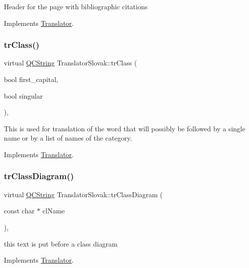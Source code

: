 Header for the page with bibliographic citations 

Implements \mbox{\hyperlink{class_translator}{Translator}}.

\mbox{\label{class_translator_slovak_ad59259153dc049698dc31ac29e8b12d5}} 
\subsubsection{\texorpdfstring{trClass()}{trClass()}}
{\footnotesize\ttfamily virtual \mbox{\hyperlink{class_q_c_string}{Q\+C\+String}} Translator\+Slovak\+::tr\+Class (\begin{DoxyParamCaption}\item[{bool}]{first\+\_\+capital,  }\item[{bool}]{singular }\end{DoxyParamCaption})\hspace{0.3cm}{\ttfamily [inline]}, {\ttfamily [virtual]}}

This is used for translation of the word that will possibly be followed by a single name or by a list of names of the category. 

Implements \mbox{\hyperlink{class_translator}{Translator}}.

\mbox{\label{class_translator_slovak_a9f00c85f79afc3bce60638211404a7fd}} 
\subsubsection{\texorpdfstring{trClassDiagram()}{trClassDiagram()}}
{\footnotesize\ttfamily virtual \mbox{\hyperlink{class_q_c_string}{Q\+C\+String}} Translator\+Slovak\+::tr\+Class\+Diagram (\begin{DoxyParamCaption}\item[{const char $\ast$}]{cl\+Name }\end{DoxyParamCaption})\hspace{0.3cm}{\ttfamily [inline]}, {\ttfamily [virtual]}}

this text is put before a class diagram 

Implements \mbox{\hyperlink{class_translator}{Translator}}.

